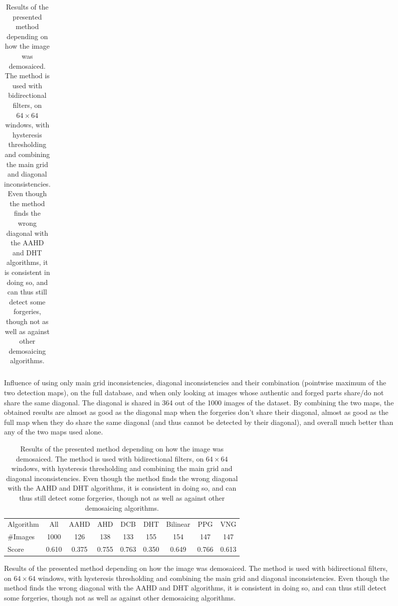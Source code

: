 \documentclass{ipol}
\begin{document}
\begin{table}[ht]
\begin{subfigure}[b]{.48\linewidth}
\begin{tabular}{lccc}
                \end{tabular}
                \caption{Influence of using only main grid inconsistencies, diagonal inconsistencies and their combination (pointwise maximum of the two detection maps), on the full database, and when only looking at images whose authentic and forged parts share/do not share the same diagonal. The diagonal is shared in 364 out of the 1000 images of the dataset. By combining the two maps, the obtained results are almost as good as the diagonal map when the forgeries don't share their diagonal, almost as good as the full map when they do share the same diagonal (and thus cannot be detected by their diagonal), and overall much better than any of the two maps used alone.}
        \end{subfigure}

        \vspace{1em}

        \begin{subfigure}[b]{\linewidth}
                \centering
                \begin{tabular}{lcccccccc}
                        \toprule
                        \scriptsize Algorithm&All& AAHD & AHD & DCB & DHT & Bilinear & PPG & VNG\\
                        \scriptsize\#Images&1000&126&138&133&155&154&147&147\\
                        \midrule
                        \scriptsize Score&0.610&0.375&0.755&0.763&0.350&0.649&0.766&0.613\\
                        \bottomrule
                \end{tabular}
                \caption{Results of the presented method depending on how the image was demosaiced. The method is used with bidirectional filters, on $64\times64$ windows, with hysteresis thresholding and combining the main grid and diagonal inconsistencies. Even though the method finds the wrong diagonal with the AAHD and DHT algorithms, it is consistent in doing so, and can thus still detect some forgeries, though not as well as against other demosaicing algorithms.}
        \end{subfigure}


\end{table}
\end{document}

